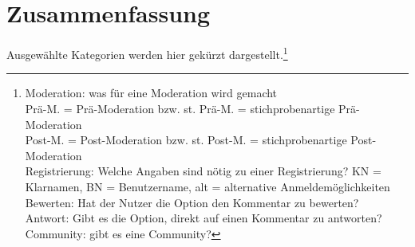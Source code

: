 \section{Zusammenfassung}


Ausgewählte Kategorien werden hier gekürzt 
dargestellt.\footnote{Moderation: was für eine Moderation wird gemacht\\
Prä-M. = Prä-Moderation bzw. st. Prä-M. = stichprobenartige Prä-Moderation\\
Post-M. = Post-Moderation bzw. st. Post-M. = stichprobenartige Post-Moderation\\
Registrierung: Welche Angaben sind nötig zu einer Registrierung? KN = Klarnamen, BN = Benutzername, alt = alternative Anmeldemöglichkeiten\\
Bewerten: Hat der Nutzer die Option den Kommentar zu bewerten?\\
Antwort: Gibt es die Option, direkt auf einen Kommentar zu antworten?\\
Community: gibt es eine Community?}

